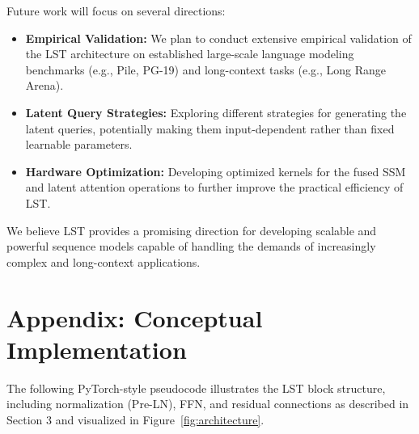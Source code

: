 \documentclass[10pt,twocolumn,letterpaper]{article}
\begin{document}
Future work will focus on several directions:
\begin{itemize}
    \item \textbf{Empirical Validation:} We plan to conduct extensive empirical validation of the LST architecture on established large-scale language modeling benchmarks (e.g., Pile, PG-19) and long-context tasks (e.g., Long Range Arena).
    \item \textbf{Latent Query Strategies:} Exploring different strategies for generating the latent queries, potentially making them input-dependent rather than fixed learnable parameters.
    \item \textbf{Hardware Optimization:} Developing optimized kernels for the fused SSM and latent attention operations to further improve the practical efficiency of LST.
\end{itemize}
We believe LST provides a promising direction for developing scalable and powerful sequence models capable of handling the demands of increasingly complex and long-context applications.




\appendix

\section{Appendix: Conceptual Implementation}

The following PyTorch-style pseudocode illustrates the LST block structure, including normalization (Pre-LN), FFN, and residual connections as described in Section 3 and visualized in Figure~\ref{fig:architecture}.
\end{document}
